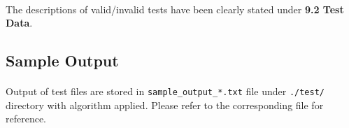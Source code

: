 \documentclass{article}
\begin{document}
            \paragraph{}
                The descriptions of valid/invalid tests have been clearly stated under
                \textbf{9.2 Test Data}.
        \subsection{Sample Output}
            \paragraph{}
                Output of test files are stored in \texttt{sample\_output\_*.txt} file under
                \texttt{./test/} directory with algorithm applied. Please refer to the
                corresponding file for reference.
                
\end{document}
